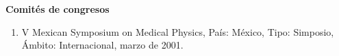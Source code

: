 {\large \textbf{Comités de congresos}}

\begin{enumerate}

\item V Mexican Symposium on Medical Physics, País: México, Tipo: Simposio, Ámbito: Internacional, marzo de 
2001.

\end{enumerate}
